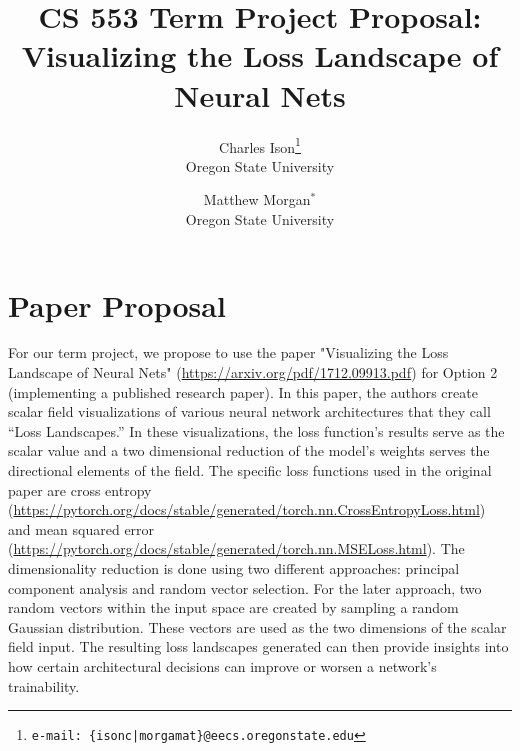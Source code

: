 \documentclass{acmsiggraph}
\title{CS 553 Term Project Proposal: Visualizing the Loss Landscape of Neural Nets}
\author{Charles Ison\thanks{\small\texttt{e-mail: \{isonc|morgamat\}@eecs.oregonstate.edu}}\\ Oregon State University
\and Matthew Morgan$^{\ast}$ \\
Oregon State University}
\begin{document}

\maketitle
\keywordlist

\section{Paper Proposal}
\label{sec:intro}

For our term project, we propose to use the paper "Visualizing the Loss Landscape of Neural Nets" (\url{https://arxiv.org/pdf/1712.09913.pdf}) for Option 2 (implementing a published research paper). In this paper, the authors create scalar field visualizations of various neural network architectures that they call “Loss Landscapes.” In these visualizations, the loss function’s results serve as the scalar value and a two dimensional reduction of the model’s weights serves the directional elements of the field. The specific loss functions used in the original paper are cross entropy (\url{https://pytorch.org/docs/stable/generated/torch.nn.CrossEntropyLoss.html}) and mean squared error (\url{https://pytorch.org/docs/stable/generated/torch.nn.MSELoss.html}).
The dimensionality reduction is done using two different approaches: principal component analysis and random vector selection. For the later approach, two random vectors within the input space are created by sampling a random Gaussian distribution. These vectors are used as the two dimensions of the scalar field input. The resulting loss landscapes generated can then provide insights into how certain architectural decisions can improve or worsen a network's trainability.
\end{document}
